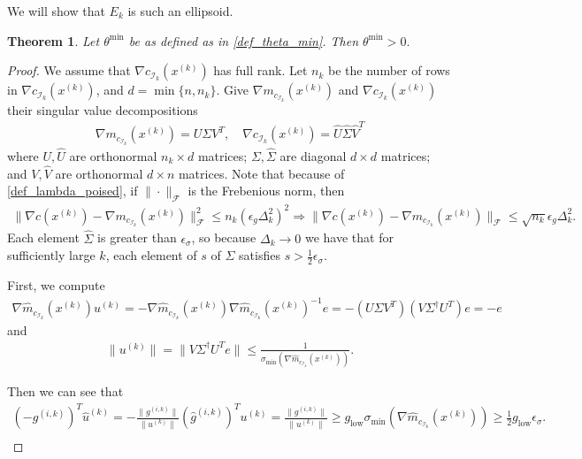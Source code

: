 \documentclass{article}
\newtheorem{theorem}{Theorem}[section]
\theoremstyle{case}
\newcommand{\dk}{\Delta_k}
\newcommand{\xk}{{x^{(k)}}}
\newcommand{\gik}{{g^{(i, k)}}}
\newcommand{\hgik}{{{\hat g}^{(i, k)}}}
\newcommand{\uk}{{u^{(k)}}}
\newcommand{\huk}{{{\hat u}^{(k)}}}
\begin{document}
We will show that $E_k$ is such an ellipsoid.



\begin{theorem}
Let $\theta^{\text{min}}$ be as defined as in \cref{def_theta_min}.
Then $\theta^{\text{min}} > 0.$
\end{theorem}

\begin{proof}
We assume that $\nabla c_{\mathcal I_k}(\xk)$ has full rank.
Let $n_k$ be the number of rows in $\nabla c_{\mathcal I_k}(\xk)$, and $d = \min \{ n, n_k \}$.
Give $\nabla m_{c_{\mathcal I_k}}(\xk)$ and $\nabla c_{\mathcal I_k}(\xk)$ their singular value decompositions
\begin{align*}
\nabla m_{c_{\mathcal I_k}}(\xk) = U\Sigma V^T, \quad
\nabla c_{\mathcal I_k}(\xk) = \hat U \hat \Sigma \hat V^T
\end{align*}
where $U, \hat U$ are orthonormal $n_k \times d$ matrices; $\Sigma, \hat \Sigma$ are diagonal $d \times d$ matrices; and $V, \hat V$ are orthonormal $d \times n$ matrices.
Note that because of \cref{def_lambda_poised}, if $\|\cdot\|_{\mathcal F}$ is the Frebenious norm, then
\begin{align*}
\|\nabla c(\xk) - \nabla m_{c_{\mathcal I_k}}(\xk)\|_{\mathcal F}^2 \le n_k \left(\epsilon_g \dk^2\right)^2
\Longrightarrow \|\nabla c(\xk) - \nabla m_{c_{\mathcal I_k}}(\xk)\|_{\mathcal F} \le \sqrt{n_k} \epsilon_g \dk^2.
\end{align*}
Each element $\hat \Sigma$ is greater than $\epsilon_{\sigma}$, so because $\dk \to 0$ we have that for sufficiently large $k$, each element of $s$ of $\Sigma$ satisfies $s > \frac 1 2 \epsilon_{\sigma}$.

First, we compute
\begin{align*}
\nabla \hat m_{c_{\mathcal I_k} }(\xk) \uk = -\nabla\hat m_{c_{\mathcal I_k} }(\xk) \nabla\hat m_{c_{\mathcal I_k} }(\xk)^{-1} e
= -(U\Sigma V^T)(V\Sigma^{\dagger} U^T)e
= -e 
\end{align*}
and
\begin{align*}
\|\uk\| = \|V\Sigma^{\dagger} U^Te\|  
\le \frac 1 {\sigma_{\text{min}}\left(\nabla \hat m_{c_{\mathcal I_k}}(\xk)\right)}.
\end{align*}

Then we can see that
\begin{align*}
(-\gik)^T\huk = -\frac{\|\gik\|}{\|\uk\|}(\hgik)^T\uk = \frac{\|\gik\|}{\|\uk\|} \ge g_{\text{low}} \sigma_{\text{min}}\left(\nabla \hat m_{c_{\mathcal I_k}}(\xk)\right) \ge \frac 1 2 g_{\text{low}}\epsilon_{\sigma}. \\
\end{align*}



\end{proof}
\end{document}

